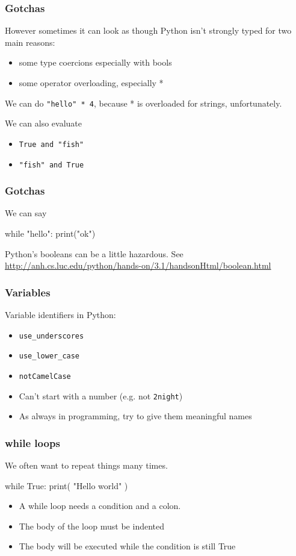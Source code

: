 \documentclass{beamer}
\begin{document}
\begin{frame}[fragile]
\frametitle{Gotchas}
However sometimes it can look as though Python isn't strongly typed
for two main reasons: 
\begin{itemize}
\item some type coercions especially with bools
\item some operator overloading, especially *
\end{itemize}
We can do \texttt{"hello" * 4}, because * is overloaded for
strings, unfortunately. 

\bigskip

We can also evaluate 
\begin{itemize}
\item \texttt{True and "fish"} 
\item \texttt{"fish" and True}
\end{itemize}

\end{frame}

\begin{frame}[fragile]
\frametitle{Gotchas}

We can say 
\begin{code}
while "hello":
  print("ok")
\end{code}
Python's booleans can be a little hazardous.  See \url{http://anh.cs.luc.edu/python/hands-on/3.1/handsonHtml/boolean.html}
\end{frame}


\begin{frame}[fragile]
\frametitle{Variables}

Variable identifiers in Python:
\begin{itemize}
\item \texttt{use\_underscores}
\item \texttt{use\_lower\_case}
\item \texttt{notCamelCase}
\item Can't start with a number (e.g. not \texttt{2night})
\item As always in programming, try to give them meaningful names
\end{itemize}
\end{frame}

\begin{frame}[fragile]
\frametitle{while loops}
We often want to repeat things many times.
\begin{code}
while True:
   print( "Hello world" )
\end{code}
\begin{itemize}
\item A while loop needs a condition and a colon.
\item The body of the loop must be indented
\item The body will be executed while the condition is still True
\end{itemize}
\end{frame}
\end{document}
